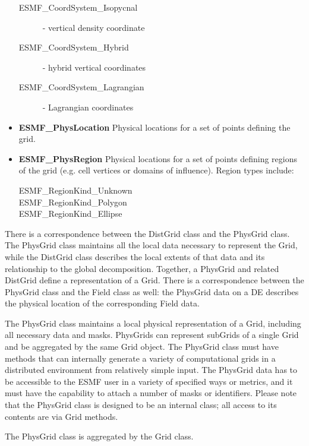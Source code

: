 \begin{itemize}
\begin{description}
   \item[ESMF\_CoordSystem\_Isopycnal] - vertical density coordinate
   \item[ESMF\_CoordSystem\_Hybrid] - hybrid vertical coordinates
   \item[ESMF\_CoordSystem\_Lagrangian] - Lagrangian coordinates
\end{description}
\item {\bf ESMF\_PhysLocation} Physical locations for a set of points defining the grid.
\item {\bf ESMF\_PhysRegion} Physical locations for a set of points defining regions of
the grid (e.g. cell vertices or domains of influence).  Region types include:
\begin{description}
   \item[ESMF\_RegionKind\_Unknown]
   \item[ESMF\_RegionKind\_Polygon]
   \item[ESMF\_RegionKind\_Ellipse]
\end{description}
\end{itemize}






There is a correspondence between the DistGrid class and the PhysGrid
class.  The PhysGrid class maintains all the local data necessary to
represent the Grid, while the DistGrid class describes the local extents
of that data and its relationship to the global decomposition.
Together, a PhysGrid and related DistGrid define a representation of
a Grid.  There is a correspondence between the PhysGrid class and the Field
class as well:  the PhysGrid data on a DE describes the physical location
of the corresponding Field data.

The PhysGrid class maintains a local physical representation of a Grid,
including all necessary data and masks.  PhysGrids can represent subGrids
of a single Grid and be aggregated by the same Grid object. The PhysGrid
class must have methods that can internally generate a variety of
computational grids in a distributed environment from relatively simple
input.  The PhysGrid data has to be accessible to the ESMF user in a
variety of specified ways or metrics, and it must have the capability to
attach a number of masks or identifiers.  Please note that the PhysGrid class
is designed to be an internal class; all access to its contents are via
Grid methods.


The PhysGrid class is aggregated by the Grid class.
